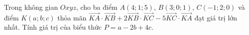 \begin{ex}
Trong không gian $Oxyz$, cho ba điểm $A(4;1;5)$, $B(3;0;1)$, $C(-1;2;0)$ và điểm $K(a;b;c)$ thỏa mãn $\overrightarrow{KA}\cdot\overrightarrow{KB}+2\overrightarrow{KB}\cdot\overrightarrow{KC}-5\overrightarrow{KC}\cdot\overrightarrow{KA}$ đạt giá trị lớn nhất. Tính giá trị của biểu thức $P=a-2b+4c$.
\end{ex}
